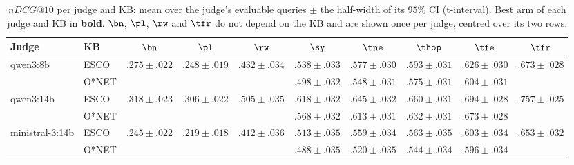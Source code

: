\begin{table}
\centering\scriptsize\setlength{\tabcolsep}{3pt}
\caption{$nDCG@10$ per judge and KB: mean over the judge's evaluable queries $\pm$ the half-width of its $95\%$ CI (t-interval). Best arm of each judge and KB in \textbf{bold}. $\bn$, $\pl$, $\rw$ and $\tfr$ do not depend on the KB and are shown once per judge, centred over its two rows.}
\label{tab:ndcg-judges}
\begin{tabular*}{\columnwidth}{@{\extracolsep{\fill}}llcccccccc}
\toprule
Judge & KB & $\bn$ & $\pl$ & $\rw$ & $\sy$ & $\tne$ & $\thop$ & $\tfe$ & $\tfr$ \\
\midrule
qwen3:8b & ESCO & \multirow{2}{*}{$.275 \pm .022$} & \multirow{2}{*}{$.248 \pm .019$} & \multirow{2}{*}{$.432 \pm .034$} & $.538 \pm .033$ & $.577 \pm .030$ & $.593 \pm .031$ & $.626 \pm .030$ & \multirow{2}{*}{$\mathbf{.673} \pm .028$} \\
 & O*NET &  &  &  & $.498 \pm .032$ & $.548 \pm .031$ & $.575 \pm .031$ & $.604 \pm .031$ &  \\
\midrule
qwen3:14b & ESCO & \multirow{2}{*}{$.318 \pm .023$} & \multirow{2}{*}{$.306 \pm .022$} & \multirow{2}{*}{$.505 \pm .035$} & $.618 \pm .032$ & $.645 \pm .032$ & $.660 \pm .031$ & $.694 \pm .028$ & \multirow{2}{*}{$\mathbf{.757} \pm .025$} \\
 & O*NET &  &  &  & $.568 \pm .032$ & $.613 \pm .031$ & $.632 \pm .031$ & $.673 \pm .028$ &  \\
\midrule
ministral-3:14b & ESCO & \multirow{2}{*}{$.245 \pm .022$} & \multirow{2}{*}{$.219 \pm .018$} & \multirow{2}{*}{$.412 \pm .036$} & $.513 \pm .035$ & $.559 \pm .034$ & $.563 \pm .035$ & $.603 \pm .034$ & \multirow{2}{*}{$\mathbf{.653} \pm .032$} \\
 & O*NET &  &  &  & $.488 \pm .035$ & $.520 \pm .035$ & $.544 \pm .034$ & $.596 \pm .034$ &  \\
\bottomrule
\end{tabular*}
\end{table}
